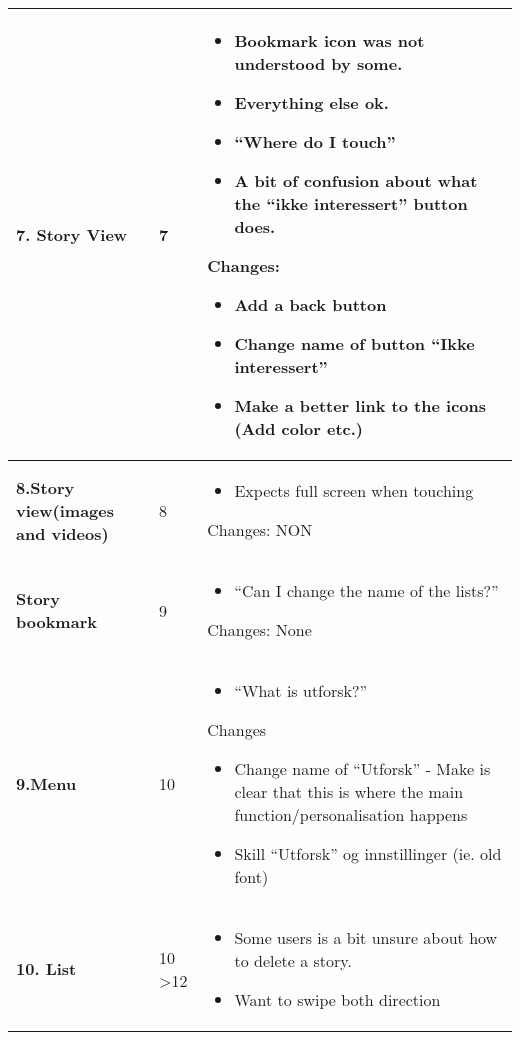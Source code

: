 {\begin{center}
\begin{longtable}{ | p{4cm} | p{3cm} | p{9cm}|}
			\textbf{7. Story View} & 7 & 
			\begin{itemize}
			\item Bookmark icon was not understood by some.
			\item Everything else ok.
			\item “Where do I touch”
			\item A bit of confusion about what the “ikke interessert” button does.
			\end{itemize}
			Changes:
			\begin{itemize}
			\item Add a back button
			\item Change name of button “Ikke interessert”
			\item Make a better link to the icons (Add color etc.)
			\end{itemize}
						\\\hline
						
			\textbf{8.Story view(images and videos)} & 8 & 
			\begin{itemize}
				\item 	Expects full screen when touching
			\end{itemize}
			
			
			Changes:
			NON
						\\\hline
			\textbf{Story bookmark} & 9  & 
				\begin{itemize}
					\item “Can I change the name of the lists?”
				\end{itemize}
			
			Changes: None	
			\\\hline
			\textbf{9.Menu} & 10  &
			 	\begin{itemize}
			 		\item “What is utforsk?” 
			 	\end{itemize}
			Changes
				\begin{itemize}
			 		\item Change name of “Utforsk” - Make is clear that this is where the main function/personalisation happens  		 	
			 		\item Skill “Utforsk” og innstillinger (ie. old font)
			 	\end{itemize}			
						\\\hline
			\textbf{10. List} & 10 \textgreater 12 &
			\begin{itemize}
				\item Some users is a bit unsure about how to delete a story.
				\item Want to swipe both direction
			\end{itemize} 
		

\end{longtable}
\end{center}}
